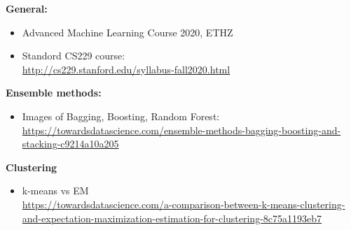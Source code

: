 \textbf{General: }
\begin{itemize}[leftmargin=*]
	\item Advanced Machine Learning Course 2020, ETHZ
	\item Standord CS229 course: \\
		\url{http://cs229.stanford.edu/syllabus-fall2020.html} 
\end{itemize}

\textbf{Ensemble methods: }
\begin{itemize}[leftmargin=*]
	\item Images of Bagging, Boosting, Random Forest: \\
		\url{https://towardsdatascience.com/ensemble-methods-bagging-boosting-and-stacking-c9214a10a205}
\end{itemize}

\textbf{Clustering}
\begin{itemize}[leftmargin=*]
	\item k-means vs EM\\
	\url{https://towardsdatascience.com/a-comparison-between-k-means-clustering-and-expectation-maximization-estimation-for-clustering-8c75a1193eb7}
\end{itemize}
